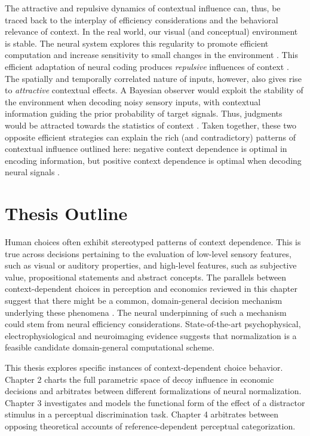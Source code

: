 \documentclass[a4paper, nobind]{templates/ociamthesis}
\begin{document}
The attractive and repulsive dynamics of contextual influence can, thus, be traced back to the interplay of efficiency considerations and the behavioral relevance of context. In the real world, our visual (and conceptual) environment is stable. The neural system explores this regularity to promote efficient computation and increase sensitivity to small changes in the environment \autocite{mattar2018}. This efficient adaptation of neural coding produces \emph{repulsive} influences of context \autocite{webster2015,fritsche2020}. The spatially and temporally correlated nature of inputs, however, also gives rise to \emph{attractive} contextual effects. A Bayesian observer would exploit the stability of the environment when decoding noisy sensory inputs, with contextual information guiding the prior probability of target signals. Thus, judgments would be attracted towards the statistics of context \autocite{vanbergen2019,fritsche2020}. Taken together, these two opposite efficient strategies can explain the rich (and contradictory) patterns of contextual influence outlined here: negative context dependence is optimal in encoding information, but positive context dependence is optimal when decoding neural signals \autocite{fritsche2020}.

\hypertarget{thesis-outline}{%
\section{Thesis Outline}\label{thesis-outline}}

Human choices often exhibit stereotyped patterns of context dependence. This is true across decisions pertaining to the evaluation of low-level sensory features, such as visual or auditory properties, and high-level features, such as subjective value, propositional statements and abstract concepts. The parallels between context-dependent choices in perception and economics reviewed in this chapter suggest that there might be a common, domain-general decision mechanism underlying these phenomena \autocite{helson1964}. The neural underpinning of such a mechanism could stem from neural efficiency considerations. State-of-the-art psychophysical, electrophysiological and neuroimaging evidence suggests that normalization is a feasible candidate domain-general computational scheme.

This thesis explores specific instances of context-dependent choice behavior. Chapter 2 charts the full parametric space of decoy influence in economic decisions and arbitrates between different formalizations of neural normalization. Chapter 3 investigates and models the functional form of the effect of a distractor stimulus in a perceptual discrimination task. Chapter 4 arbitrates between opposing theoretical accounts of reference-dependent perceptual categorization.
\end{document}
